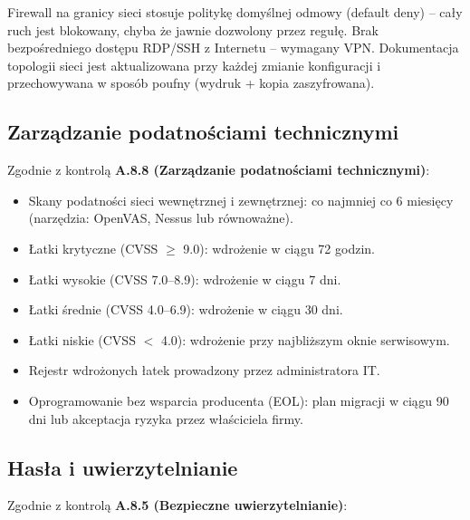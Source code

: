 \documentclass[12pt,a4paper]{article}
\providecommand{\tightlist}{\setlength{\itemsep}{0pt}\setlength{\parskip}{0pt}}
\begin{document}
Firewall na granicy sieci stosuje politykę domyślnej odmowy (default deny) -- cały ruch jest blokowany, chyba że jawnie dozwolony przez regułę. Brak bezpośredniego dostępu RDP/SSH z Internetu -- wymagany VPN. Dokumentacja topologii sieci jest aktualizowana przy każdej zmianie konfiguracji i przechowywana w sposób poufny (wydruk + kopia zaszyfrowana).

\subsection{Zarządzanie podatnościami technicznymi}\label{zarzadzanie-podatnosciami-technicznymi}

Zgodnie z kontrolą \textbf{A.8.8 (Zarządzanie podatnościami technicznymi)}:
\begin{itemize}
\tightlist
\item
  Skany podatności sieci wewnętrznej i zewnętrznej: co najmniej co 6 miesięcy (narzędzia: OpenVAS, Nessus lub równoważne).
\item
  Łatki krytyczne (CVSS $\geq$ 9.0): wdrożenie w ciągu 72 godzin.
\item
  Łatki wysokie (CVSS 7.0--8.9): wdrożenie w ciągu 7 dni.
\item
  Łatki średnie (CVSS 4.0--6.9): wdrożenie w ciągu 30 dni.
\item
  Łatki niskie (CVSS $<$ 4.0): wdrożenie przy najbliższym oknie serwisowym.
\item
  Rejestr wdrożonych łatek prowadzony przez administratora IT.
\item
  Oprogramowanie bez wsparcia producenta (EOL): plan migracji w ciągu 90 dni lub akceptacja ryzyka przez właściciela firmy.
\end{itemize}

\subsection{Hasła i
uwierzytelnianie}\label{hasux142a-i-uwierzytelnianie}

Zgodnie z kontrolą \textbf{A.8.5 (Bezpieczne uwierzytelnianie)}:
\end{document}
